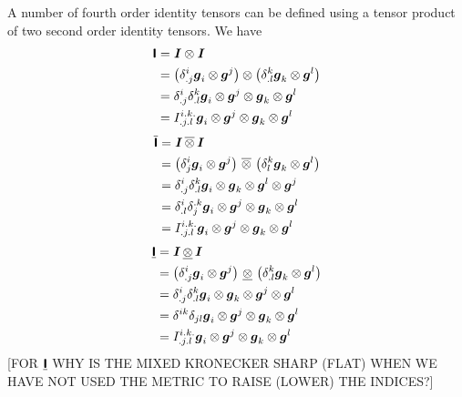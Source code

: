 A number of fourth order identity tensors can be defined using a tensor
product of two second order identity tensors. We have
\begin{equation}
  \begin{aligned}
      \boldsymbol{\mathsf{ I }}  &=   \boldsymbol{\mathit{ I }}   \otimes   \boldsymbol{\mathit{ I }}   \\
    &= \left(  \delta^{i}_{.j}   \boldsymbol{g} _{i} \otimes  \boldsymbol{g} ^{j}  \right) \otimes \left(  \delta^{k}_{.l}   \boldsymbol{g} _{k} \otimes  \boldsymbol{g} ^{l}  \right) \\
    &= \delta^{i}_{.j}  \delta^{k}_{.l}   \boldsymbol{g} _{i} \otimes  \boldsymbol{g} ^{j} \otimes  \boldsymbol{g} _{k} \otimes  \boldsymbol{g} ^{l} \\
    &=I^{i.k.}_{.j.l}  \boldsymbol{g} _{i} \otimes  \boldsymbol{g} ^{j} \otimes  \boldsymbol{g} _{k} \otimes  \boldsymbol{g} ^{l} 
  \end{aligned}
\end{equation}
\begin{equation}
  \begin{aligned}
      \overline{\boldsymbol{\mathsf{ I }}}  &=   \boldsymbol{\mathit{ I }}   \, \overline{\otimes} \,   \boldsymbol{\mathit{ I }}   \\
    &= \left(  \delta^{i}_{j}   \boldsymbol{g} _{i} \otimes  \boldsymbol{g} ^{j}  \right) \, \overline{\otimes} \, \left(  \delta^{k}_{l}   \boldsymbol{g} _{k} \otimes  \boldsymbol{g} ^{l}  \right) \\
    &= \delta^{i}_{.j}  \delta^{k}_{.l}   \boldsymbol{g} _{i} \otimes  \boldsymbol{g} _{k} \otimes  \boldsymbol{g} ^{l} \otimes  \boldsymbol{g} ^{j} \\
    &= \delta^{i}_{.l}  \delta^{.k}_{j}   \boldsymbol{g} _{i} \otimes  \boldsymbol{g} ^{j} \otimes  \boldsymbol{g} _{k} \otimes  \boldsymbol{g} ^{l} \\
    &=I^{i.k.}_{.j.l}  \boldsymbol{g} _{i} \otimes  \boldsymbol{g} ^{j} \otimes  \boldsymbol{g} _{k} \otimes  \boldsymbol{g} ^{l} 
  \end{aligned}
\end{equation}
\begin{equation}
  \begin{aligned}
      \underline{\boldsymbol{\mathsf{ I }}}  &=   \boldsymbol{\mathit{ I }}   \, \underline{\otimes} \,   \boldsymbol{\mathit{ I }}   \\
    &= \left(  \delta^{i}_{.j}   \boldsymbol{g} _{i} \otimes  \boldsymbol{g} ^{j}  \right) \, \underline{\otimes} \, \left(  \delta^{k}_{.l}   \boldsymbol{g} _{k} \otimes  \boldsymbol{g} ^{l}  \right) \\
    &= \delta^{i}_{.j}  \delta^{k}_{.l}   \boldsymbol{g} _{i} \otimes  \boldsymbol{g} _{k} \otimes  \boldsymbol{g} ^{j} \otimes  \boldsymbol{g} ^{l} \\
    &= \delta^{{i}{k}}  \delta_{{j}{l}}   \boldsymbol{g} _{i} \otimes  \boldsymbol{g} ^{j} \otimes  \boldsymbol{g} _{k} \otimes  \boldsymbol{g} ^{l} \\
    &=I^{i.k.}_{.j.l}  \boldsymbol{g} _{i} \otimes  \boldsymbol{g} ^{j} \otimes  \boldsymbol{g} _{k} \otimes  \boldsymbol{g} ^{l} 
  \end{aligned}
\end{equation}
[FOR $  \underline{\boldsymbol{\mathsf{ I }}}  $ WHY IS THE MIXED KRONECKER SHARP (FLAT) WHEN WE HAVE
  NOT USED THE METRIC TO RAISE (LOWER) THE INDICES?]

